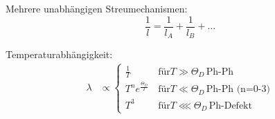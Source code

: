 Mehrere unabhängigen Streumechanismen:
\begin{equation*}
    \frac{1}{l} = \frac{1}{l_A} + \frac{1}{l_B} + \dots
\end{equation*}

Temperaturabhängigkeit:
\begin{equation*}
    \begin{aligned}
        \lambda &\propto \begin{cases}
            \frac{1}{T} & \, \text{für} T \gg \Theta_D \, \text{Ph-Ph} \\
            T^ne^{\frac{\Theta_D}{T}} &  \, \text{für} T \ll \Theta_D \, \text{Ph-Ph (n=0-3)} \\
            T^3 & \, \text{für} T \lll \Theta_D \, \text{Ph-Defekt}
            \end{cases} \\
    \end{aligned}
\end{equation*}